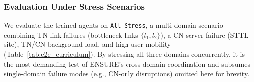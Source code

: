 \documentclass[12pt,lettersize,journal,onecolumn]{IEEEtran}
\newcommand{\subsubsubsection}[1]{\paragraph{#1}}
\begin{document}
\subsubsection{Evaluation Under Stress Scenarios}\label{subsubsec:e2e_eval}
We evaluate the trained agents on \texttt{All\_Stress}, a multi-domain scenario combining TN link failures (bottleneck links $\{l_1, l_2\}$), a CN server failure (STTL site), TN/CN background load, and high user mobility (Table~\ref{tab:e2e_curriculum}). By stressing all three domains concurrently, it is the most demanding test of ENSURE's cross-domain coordination and subsumes single-domain failure modes (e.g., CN-only disruptions) omitted here for brevity.


\end{document}
